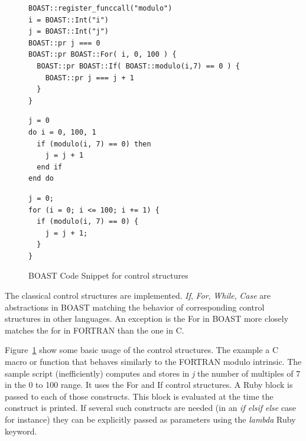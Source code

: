 \documentclass[11pt, a4paper, twoside]{montblanc}
\begin{document}
\begin{figure}
\begin{lstlisting}
BOAST::register_funccall("modulo")
i = BOAST::Int("i")
j = BOAST::Int("j")
BOAST::pr j === 0
BOAST::pr BOAST::For( i, 0, 100 ) {
  BOAST::pr BOAST::If( BOAST::modulo(i,7) == 0 ) {
    BOAST::pr j === j + 1
  }
}
\end{lstlisting}

\begin{minipage}[b]{0.47\linewidth}
\centering
{}

\begin{lstlisting}
j = 0
do i = 0, 100, 1
  if (modulo(i, 7) == 0) then
    j = j + 1
  end if
end do
\end{lstlisting}
\end{minipage}
\hspace{0.04\linewidth}
\begin{minipage}[b]{0.47\linewidth}
\centering
{}

\begin{lstlisting}
j = 0;
for (i = 0; i <= 100; i += 1) {
  if (modulo(i, 7) == 0) {
    j = j + 1;
  }
}
\end{lstlisting}
\end{minipage}
\caption{BOAST Code Snippet for control structures}
\label{fig:BOAST_control}
\end{figure}

The classical control structures are implemented. \emph{If}, \emph{For},
\emph{While}, \emph{Case} are abstractions in BOAST matching the behavior of
corresponding control structures in other languages. An exception is the For in
BOAST more closely matches the for in FORTRAN than the one in C.

Figure~\ref{fig:BOAST_control} show some basic usage of the control structures.
The example a C macro or function that behaves similarly to the FORTRAN modulo
intrinsic. The sample script (inefficiently) computes and stores in \emph{j} the
number of multiples of $7$ in the 0 to 100 range. It uses the For and If control
structures. A Ruby block is passed to each of those constructs. This block is
evaluated at the time the construct is printed. If several such constructs are
needed (in an \emph{if elsif else} case for instance) they can be explicitly
passed as parameters using the \emph{lambda} Ruby keyword.
\end{document}
